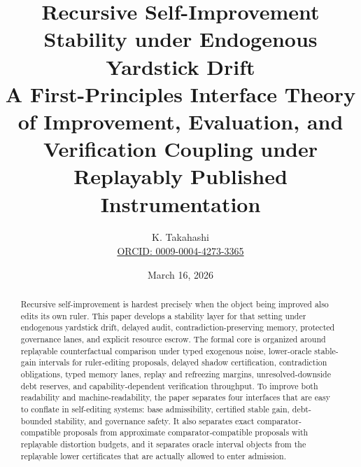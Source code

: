\documentclass[11pt]{article}
\title{\textbf{Recursive Self-Improvement Stability under Endogenous Yardstick Drift}\\
\large A First-Principles Interface Theory of Improvement, Evaluation, and Verification Coupling under Replayably Published Instrumentation}
\author{K. Takahashi\\\footnotesize\href{https://orcid.org/0009-0004-4273-3365}{ORCID: 0009-0004-4273-3365}}
\date{March 16, 2026}
\theoremstyle{definition}
\newcommand{\1}{\mathbf{1}}
\begin{document}
\maketitle

\begin{abstract}
Recursive self-improvement is hardest precisely when the object being improved also edits its own ruler. This paper develops a stability layer for that setting under endogenous yardstick drift, delayed audit, contradiction-preserving memory, protected governance lanes, and explicit resource escrow. The formal core is organized around replayable counterfactual comparison under typed exogenous noise, lower-oracle stable-gain intervals for ruler-editing proposals, delayed shadow certification, contradiction obligations, typed memory lanes, replay and refreezing margins, unresolved-downside debt reserves, and capability-dependent verification throughput. To improve both readability and machine-readability, the paper separates four interfaces that are easy to conflate in self-editing systems: base admissibility, certified stable gain, debt-bounded stability, and governance safety. It also separates exact comparator-compatible proposals from approximate comparator-compatible proposals with replayable distortion budgets, and it separates oracle interval objects from the replayable lower certificates that are actually allowed to enter admission.


\end{abstract}
\end{document}
